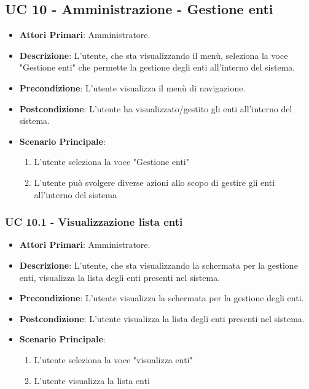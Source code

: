 \subsection{UC 10 - Amministrazione - Gestione enti}

		\begin{itemize}
			\item \textbf{Attori Primari}: Amministratore.
			\item \textbf{Descrizione}: L'utente, che sta visualizzando il menù, seleziona la voce "Gestione enti" che permette la gestione degli enti all'interno del sistema.
			\item \textbf{Precondizione}: L'utente visualizza il menù di navigazione.
			\item \textbf{Postcondizione}: L'utente ha visualizzato/gestito gli enti all'interno del sistema. 
			\item \textbf{Scenario Principale}:
			\begin{enumerate}
				\item{L'utente seleziona la voce "Gestione enti"}
				\item{L'utente può svolgere diverse azioni allo scopo di gestire gli enti all'interno del sistema}
			\end{enumerate}	
		\end{itemize}

			\subsubsection{UC 10.1 - Visualizzazione lista enti }
			\begin{itemize}
				\item \textbf{Attori Primari}: Amministratore.
				\item \textbf{Descrizione}: L'utente, che sta visualizzando la schermata per la gestione enti, visualizza la lista degli enti presenti nel sistema.
				\item \textbf{Precondizione}: L'utente visualizza la schermata per la gestione degli enti.
				\item \textbf{Postcondizione}: L'utente visualizza la lista degli enti presenti nel sistema.
				\item \textbf{Scenario Principale}:
				\begin{enumerate}
					\item{L'utente seleziona la voce "visualizza enti"}
					\item{L'utente visualizza la lista enti}
				\end{enumerate}	
			\end{itemize}

